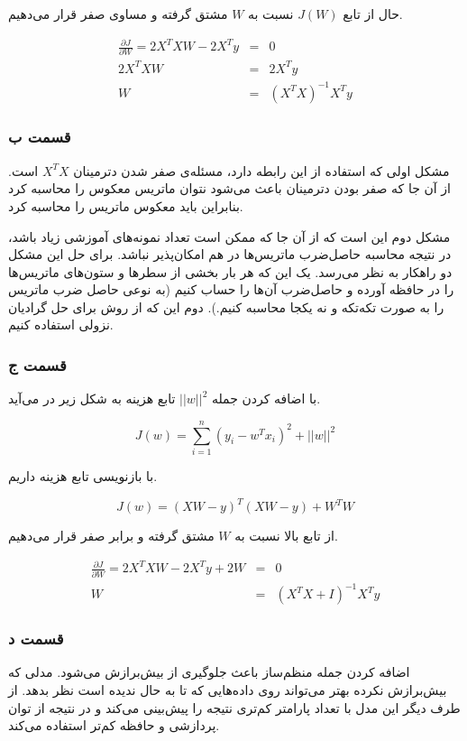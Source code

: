 \documentclass[14pt,a4]{article}
\begin{document}
حال از تابع $J(W)$ نسبت به $W$ مشتق گرفته و مساوی صفر قرار می‌دهیم.

\begin{eqnarray*}
    \frac{\partial J}{\partial W} = 2 X^TXW - 2X^Ty  & = & 0 \\
    2X^TXW & = & 2 X^Ty \\
    W & = & (X^TX)^{-1} X^Ty
\end{eqnarray*}

\subsubsection*{قسمت ب}

مشکل اولی که استفاده از این رابطه دارد، مسئله‌ی صفر شدن دترمینان $X^TX$ است. از آن جا که صفر بودن دترمینان
باعث می‌شود نتوان ماتریس معکوس را محاسبه کرد بنابراین باید معکوس  ماتریس را محاسبه کرد.

مشکل دوم این است که از آن جا که ممکن است تعداد نمونه‌های آموزشی زیاد باشد، در نتیجه محاسبه‌ حاصل‌ضرب
ماتریس‌ها در هم امکان‌پذیر نباشد. برای حل این مشکل دو راهکار به نظر می‌رسد. یک این که هر بار بخشی از سطر‌ها و
ستون‌های ماتریس‌ها را در حافظه آورده و حاصل‌ضرب آن‌ها را حساب کنیم (به نوعی حاصل ضرب ماتریس را به صورت
تکه‌تکه و نه یکجا محاسبه کنیم.). دوم این که از روش  برای حل گرادیان نزولی استفاده کنیم.

\subsubsection*{قسمت ج}

با اضافه کردن جمله $||w||^2$ تابع هزینه به شکل زیر در می‌آید.

$$J(w) = \sum_{i=1}^{n} (y_i - w^T x_i)^2 + ||w||^2$$

با بازنویسی تابع هزینه داریم.

$$J(w) = (XW - y)^T (XW - y) + W^TW$$

از تابع بالا نسبت به $W$ مشتق گرفته و برابر صفر قرار می‌دهیم.

\begin{eqnarray*}
    \frac{\partial J}{\partial W} = 2 X^TXW - 2X^Ty + 2W & = & 0 \\
    W & = & (X^TX + I)^{-1} X^T y
\end{eqnarray*}

\subsubsection*{قسمت د}

اضافه کردن جمله منظم‌ساز باعث جلوگیری از بیش‌برازش می‌شود. مدلی که بیش‌برازش نکرده بهتر می‌تواند روی داده‌هایی که
تا به حال ندیده است نظر بدهد. از طرف دیگر این مدل با تعداد پارامتر کم‌تری نتیجه را پیش‌بینی می‌کند و در نتیجه
از توان پردازشی و حافظه کم‌تر استفاده می‌کند.
\end{document}
